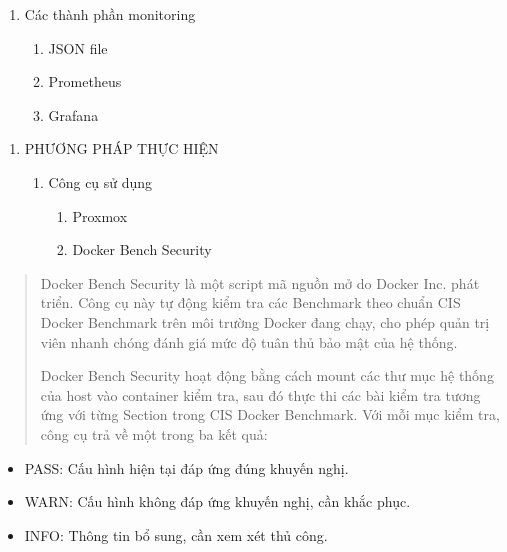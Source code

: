 \begin{enumerate}
\def\labelenumi{\arabic{enumi}.}
\item
  \protect{}\label{Phux1b0ux1a1ng_phuxe1p_thux1ef1c_hiux1ec7n}{}Các thành phần monitoring

  \begin{enumerate}
  \def\labelenumii{\arabic{enumii}.}
  \item
    JSON file
  \item
    Prometheus
  \item
    Grafana
  \end{enumerate}
\end{enumerate}

\begin{enumerate}
\def\labelenumi{\arabic{enumi}.}
\item
  PHƯƠNG PHÁP THỰC HIỆN

  \begin{enumerate}
  \def\labelenumii{\arabic{enumii}.}
  \item
    \protect{}\label{Cuxf4ng_cux1ee5_sux1eed_dux1ee5ng}{}Công cụ sử dụng

    \begin{enumerate}
    \def\labelenumiii{\arabic{enumiii}.}
    \item
      \protect{}\label{Linux_}{}Proxmox
    \item
      \protect{}\label{Docker_Bench_Security}{}Docker Bench Security
    \end{enumerate}
  \end{enumerate}
\end{enumerate}

\begin{quote}
Docker Bench Security là một script mã nguồn mở do Docker Inc. phát triển. Công cụ này tự động kiểm tra các Benchmark theo chuẩn CIS Docker Benchmark trên môi trường Docker đang chạy, cho phép quản trị viên nhanh chóng đánh giá mức độ tuân thủ bảo mật của hệ thống.

Docker Bench Security hoạt động bằng cách mount các thư mục hệ thống của host vào container kiểm tra, sau đó thực thi các bài kiểm tra tương ứng với từng Section trong CIS Docker Benchmark. Với mỗi mục kiểm tra, công cụ trả về một trong ba kết quả:
\end{quote}

\begin{itemize}
\item
  PASS: Cấu hình hiện tại đáp ứng đúng khuyến nghị.
\item
  WARN: Cấu hình không đáp ứng khuyến nghị, cần khắc phục.
\item
  INFO: Thông tin bổ sung, cần xem xét thủ công.
\end{itemize}

